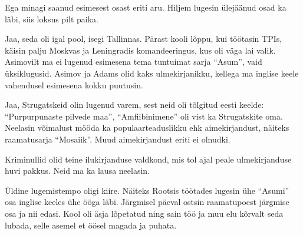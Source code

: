 
Ega minagi saanud esimesest osast eriti aru. Hiljem lugesin ülejäänud osad ka läbi, siis loksus 
pilt paika.


Jaa, seda oli igal pool, isegi Tallinnas. 
Pärast kooli lõppu, kui töötasin TPIs, 
käisin palju Moskvas ja Leningradis komandeeringus, kus oli väga 
lai valik. Asimovilt ma ei lugenud esimesena tema tuntuimat sarja \enquote{Asum}, vaid 
üksiklugusid. Asimov ja Adams olid kaks ulmekirjanikku, 
kellega ma inglise keele vahendusel esimesena kokku puutusin. 


Jaa, Strugatskeid olin lugenud varem, sest neid oli tõlgitud eesti keelde: 
\enquote{Purpurpunaste pilvede maa}\label{sisu:purpur}, \enquote{Amfiibinimene} oli vist ka 
Strugatskite oma. Neelasin võimalust mööda ka populaarteaduslikku ehk 
aimekirjandust, näiteks raamatusarja \enquote{Mosaiik}. Muud
aimekirjandust eriti ei olnudki.

Kriminullid olid teine ilukirjanduse valdkond, mis tol ajal peale ulmekirjanduse 
huvi pakkus. Neid ma ka lausa neelasin.

Üldine lugemistempo oligi kiire. Näiteks Rootsis töötades lugesin ühe \enquote{Asumi} osa 
inglise keeles ühe ööga läbi. Järgmisel päeval ostsin raamatupoest järgmise osa ja nii edasi. Kool oli äsja lõpetatud ning sain töö ja muu 
elu kõrvalt seda lubada, selle asemel et öösel magada ja puhata.

